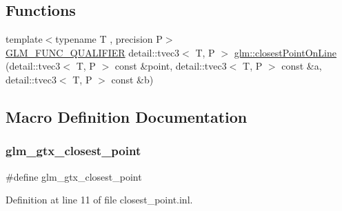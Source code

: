 \subsection*{Functions}
\begin{DoxyCompactItemize}
\item 
{\footnotesize template$<$typename T , precision P$>$ }\\\hyperlink{setup_8hpp_a33fdea6f91c5f834105f7415e2a64407}{G\+L\+M\+\_\+\+F\+U\+N\+C\+\_\+\+Q\+U\+A\+L\+I\+F\+I\+ER} detail\+::tvec3$<$ T, P $>$ \hyperlink{group__gtx__closest__point_ga03a6d7e93590f5d45050f6dc7aa8bf8f}{glm\+::closest\+Point\+On\+Line} (detail\+::tvec3$<$ T, P $>$ const \&point, detail\+::tvec3$<$ T, P $>$ const \&a, detail\+::tvec3$<$ T, P $>$ const \&b)
\end{DoxyCompactItemize}


\subsection{Macro Definition Documentation}
\mbox{\label{closest__point_8inl_af884ff4983e76fd2ef24511db8e29251}} 
\subsubsection{\texorpdfstring{glm\+\_\+gtx\+\_\+closest\+\_\+point}{glm\_gtx\_closest\_point}}
{\footnotesize\ttfamily \#define glm\+\_\+gtx\+\_\+closest\+\_\+point}



Definition at line 11 of file closest\+\_\+point.\+inl.


